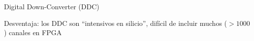 \documentclass[ignorenonframetext,12pt]{beamer}
\begin{document}
\begin{frame}{Digital Down-Converter (DDC)}
				\begin{center}
				\end{center}
								Desventaja: los DDC son ``intensivos en silicio'', difícil de
								incluir muchos ($>1000$) canales en FPGA
\end{frame}
\end{document}
